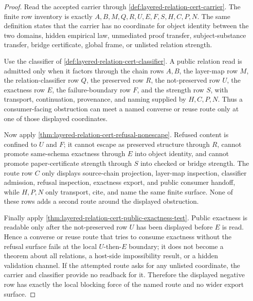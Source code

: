 \begin{proof}
Read the accepted carrier through \autoref{def:layered-relation-cert-carrier}. The finite row inventory is exactly $A,B,M,Q,R,U,E,F,S,H,C,P,N$. The same definition states that the carrier has no coordinate for object identity between the two domains, hidden empirical law, unmediated proof transfer, subject-substance transfer, bridge certificate, global frame, or unlisted relation strength.

Use the classifier of \autoref{def:layered-relation-cert-classifier}. A public relation read is admitted only when it factors through the chain rows $A,B$, the layer-map row $M$, the relation-classifier row $Q$, the preserved row $R$, the not-preserved row $U$, the exactness row $E$, the failure-boundary row $F$, and the strength row $S$, with transport, continuation, provenance, and naming supplied by $H,C,P,N$. Thus a consumer-facing obstruction can meet a named converse or reuse route only at one of those displayed coordinates.

Now apply \autoref{thm:layered-relation-cert-refusal-nonescape}. Refused content is confined to $U$ and $F$; it cannot escape as preserved structure through $R$, cannot promote same-schema exactness through $E$ into object identity, and cannot promote paper-certificate strength through $S$ into checked or bridge strength. The route row $C$ only displays source-chain projection, layer-map inspection, classifier admission, refusal inspection, exactness export, and public consumer handoff, while $H,P,N$ only transport, cite, and name the same finite surface. None of these rows adds a second route around the displayed obstruction.

Finally apply \autoref{thm:layered-relation-cert-public-exactness-test}. Public exactness is readable only after the not-preserved row $U$ has been displayed before $E$ is read. Hence a converse or reuse route that tries to consume exactness without the refusal surface fails at the local $U$-then-$E$ boundary; it does not become a theorem about all relations, a host-side impossibility result, or a hidden validation channel. If the attempted route asks for any unlisted coordinate, the carrier and classifier provide no readback for it. Therefore the displayed negative row has exactly the local blocking force of the named route and no wider export surface.
\end{proof}
